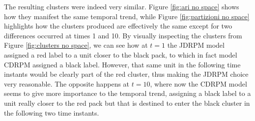\documentclass[12pt,	%
	a4paper,		%
	twoside,		%
	openright,		%
	titlepage,%
	]{book}
\theoremstyle{definition}
\begin{document}
The resulting clusters were indeed very similar. Figure \ref{fig:ari no space} shows how they manifest the same temporal trend, while Figure \ref{fig:partizioni no space} highlights how the clusters produced are effectively the same except for two differences occurred at times 1 and 10. 
By visually inspecting the clusters from Figure \ref{fig:clusters no space}, we can see how at $t=1$ the JDRPM model assigned a red label to a unit closer to the black pack, to which in fact model CDRPM assigned a black label. However, that same unit in the following time instants would be clearly part of the red cluster, thus making the JDRPM choice very reasonable. The opposite happens at $t=10$, where now the CDRPM model seems to give more importance to the temporal trend, assigning a black label to a unit really closer to the red pack but that is destined to enter the black cluster in the following two time instants.
\end{document}
